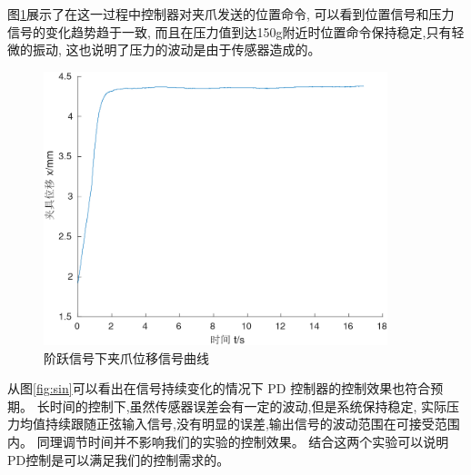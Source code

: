 图\ref{fig:150_x}展示了在这一过程中控制器对夹爪发送的位置命令,
可以看到位置信号和压力信号的变化趋势趋于一致,
而且在压力值到达150g附近时位置命令保持稳定,只有轻微的振动,
这也说明了压力的波动是由于传感器造成的。

\begin{figure}[!ht]
  \centering
  \includegraphics[width=10cm]{chapter04/pic/150_x}
  \caption{\label{fig:150_x}
    阶跃信号下夹爪位移信号曲线}
  \vspace{-0.3cm}
\end{figure}





从图\ref{fig:sin}可以看出在信号持续变化的情况下 PD 控制器的控制效果也符合预期。
长时间的控制下,虽然传感器误差会有一定的波动,但是系统保持稳定,
实际压力均值持续跟随正弦输入信号,没有明显的误差,输出信号的波动范围在可接受范围内。
同理调节时间并不影响我们的实验的控制效果。
结合这两个实验可以说明 PD控制是可以满足我们的控制需求的。

